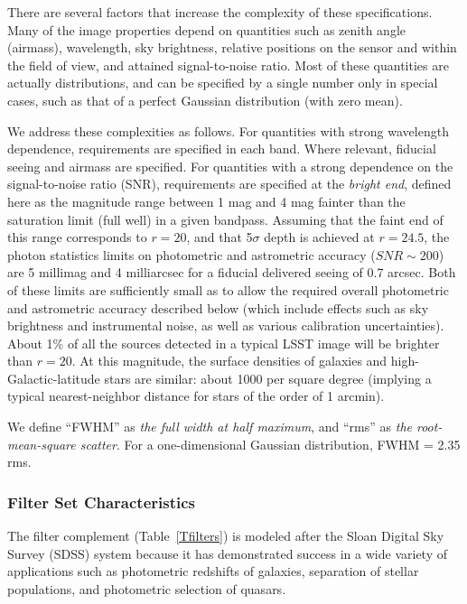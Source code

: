 There are several factors that increase the complexity of these
specifications. Many of the image properties depend on quantities such
as zenith angle (airmass), wavelength, sky brightness, relative positions
on the sensor and within the field of view, and attained signal-to-noise
ratio.  Most of these quantities are actually distributions, and can be
specified by a single number only in special cases, such as that of a
perfect Gaussian distribution (with zero mean).

We address these complexities as follows. For quantities with strong
wavelength dependence, requirements are specified in each band. Where
relevant, fiducial seeing and airmass are specified. For quantities with a
strong dependence on the signal-to-noise ratio (SNR), requirements are
specified at the {\it bright end}, defined here as the magnitude range
between 1 mag and 4 mag fainter than the saturation limit (full well) in a given
bandpass.  Assuming that the faint end of this range corresponds to $r=20$,
and that 5$\sigma$ depth is achieved at $r=24.5$, the photon statistics
limits on photometric and astrometric accuracy ($SNR\sim200$) are 5 millimag
and 4 milliarcsec for a fiducial delivered seeing of 0.7 arcsec. Both of these
limits are sufficiently small as to allow the required overall photometric
and astrometric accuracy described below (which include effects such as sky
brightness and instrumental noise, as well as various calibration
uncertainties).  About 1\% of all the sources detected in a typical LSST
image will be brighter than $r=20$. At this magnitude, the surface
densities of galaxies and high-Galactic-latitude stars are similar: about
1000 per square degree (implying a typical nearest-neighbor distance for
stars of the order of 1 arcmin).

We define ``FWHM'' as {\it the full width at half maximum}, and ``rms'' as
{\it the root-mean-square scatter}. For a one-dimensional Gaussian distribution,
FWHM = 2.35\,rms.


\subsubsection{Filter Set Characteristics}

The filter complement (Table~\ref{Tfilters}) is modeled after the Sloan
Digital Sky Survey (SDSS) system because it has demonstrated success in a
wide variety of applications such as photometric redshifts of galaxies,
separation of stellar populations, and photometric selection of quasars.

